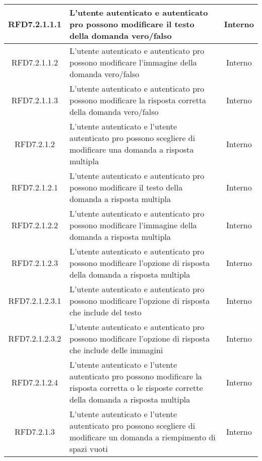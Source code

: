 \begin{longtable}{|c|>{\centering}m{7cm}|c|}
\hypertarget{RFD7.2.1.1.1}{RFD7.2.1.1.1} & L’utente autenticato e autenticato pro possono modificare il testo della domanda vero/falso & Interno
\\ \hline

\hypertarget{RFD7.2.1.1.2}{RFD7.2.1.1.2} & L’utente autenticato e autenticato pro possono modificare l’immagine della domanda vero/falso & Interno
\\ \hline

\hypertarget{RFD7.2.1.1.3}{RFD7.2.1.1.3} & L’utente autenticato e autenticato pro possono modificare la risposta corretta della domanda vero/falso & Interno
\\ \hline

\hypertarget{RFD7.2.1.2}{RFD7.2.1.2} & L’utente autenticato e l’utente autenticato pro possono scegliere di modificare una domanda a risposta multipla & Interno
\\ \hline

\hypertarget{RFD7.2.1.2.1}{RFD7.2.1.2.1} & L’utente autenticato e autenticato pro possono modificare il testo della domanda a risposta multipla & Interno
\\ \hline

\hypertarget{RFD7.2.1.2.2}{RFD7.2.1.2.2} & L’utente autenticato e autenticato pro possono modificare l’immagine della domanda a risposta multipla & Interno
\\ \hline

\hypertarget{RFD7.2.1.2.3}{RFD7.2.1.2.3} & L’utente autenticato e autenticato pro possono modificare l’opzione di risposta della domanda a risposta multipla & Interno
\\ \hline

\hypertarget{RFD7.2.1.2.3.1}{RFD7.2.1.2.3.1} & L’utente autenticato e autenticato pro possono modificare l’opzione di risposta che include del testo & Interno
\\ \hline

\hypertarget{RFD7.2.1.2.3.2}{RFD7.2.1.2.3.2} & L’utente autenticato e autenticato pro possono modificare l’opzione di risposta che include delle immagini & Interno
\\ \hline

\hypertarget{RFD7.2.1.2.4}{RFD7.2.1.2.4} & L’utente autenticato e l’utente autenticato pro possono modificare la risposta corretta o le risposte corrette della domanda a risposta multipla & Interno
\\ \hline

\hypertarget{RFD7.2.1.3}{RFD7.2.1.3} & L’utente autenticato e l’utente autenticato pro possono scegliere di modificare un domanda a riempimento di spazi vuoti & Interno
\\ \hline


\end{longtable}
